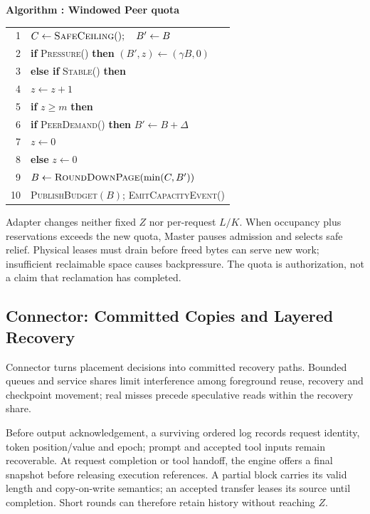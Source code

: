 \par\medskip\noindent\begin{minipage}{\columnwidth}
\raggedright
 \label{alg:adapter}
 \textbf{Algorithm \thedesignalgorithm: Windowed Peer quota}
 \par\smallskip
 \begin{tabularx}{\columnwidth}{@{}r@{\quad}X@{}}
 \toprule
 1 & $C\gets\textsc{SafeCeiling}();\quad B'\gets B$ \\
 2 & \textbf{if} \textsc{Pressure}() \textbf{then} $(B',z)\gets(\gamma B,0)$ \\
 3 & \textbf{else if} \textsc{Stable}() \textbf{then} \\
 4 & \quad $z\gets z+1$ \\
 5 & \quad \textbf{if} $z\ge m$ \textbf{then} \\
 6 & \qquad \textbf{if} \textsc{PeerDemand}() \textbf{then} $B'\gets B+\Delta$ \\
 7 & \qquad $z\gets0$ \\
 8 & \textbf{else} $z\gets0$ \\
 9 & $B\gets\textsc{RoundDownPage}(\min(C,B'))$ \\
 10 & \textsc{PublishBudget}$(B)$; \textsc{EmitCapacityEvent}() \\
 \bottomrule
 \end{tabularx}
\end{minipage}\par\medskip

Adapter changes neither fixed $Z$ nor per-request $L/K$. When occupancy
plus reservations exceeds the new quota, Master pauses admission and
selects safe relief. Physical leases must drain before freed bytes can
serve new work; insufficient reclaimable space causes backpressure.
The quota is authorization, not a claim that reclamation has completed.

\subsection{Connector: Committed Copies and Layered Recovery}
\label{sec:connector}

Connector turns placement decisions into committed recovery paths.
Bounded queues and service shares limit interference among foreground
reuse, recovery and checkpoint movement; real misses precede speculative
reads within the recovery share.

Before output acknowledgement, a surviving ordered log records request
identity, token position/value and epoch; prompt and accepted tool inputs
remain recoverable. At request completion or tool handoff, the engine
offers a final snapshot before releasing execution references. A partial
block carries its valid length and copy-on-write semantics; an accepted
transfer leases its source until completion. Short rounds can therefore
retain history without reaching $Z$.

